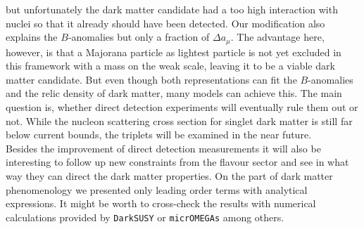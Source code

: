 but unfortunately the dark matter candidate had a too high interaction with nuclei so that it already should have been detected. Our modification 
also explains the 
$B$-anomalies but only a fraction of $\Delta a_\mu$. The advantage here, however, is that a Majorana particle as lightest particle is not yet
excluded in this framework with a mass on the weak scale, leaving it to be a viable dark matter candidate. But even though both representations 
can fit the $B$-anomalies and the relic density of dark matter, many models can achieve this. The main question is, whether direct detection 
experiments will eventually rule them out or not. While the nucleon scattering cross section for singlet dark matter is still far below current bounds,
the triplets will be examined in the near future.\\
\noindent Besides the improvement of direct detection measurements it will also be interesting to follow up new constraints from the flavour 
sector and see in what way they can direct the dark matter properties. On the part of dark matter phenomenology we presented only leading order
terms with analytical expressions. It might be worth to cross-check the results with numerical calculations provided by \texttt{DarkSUSY} 
\cite{0406204} or \texttt{micrOMEGAs} \cite{1005.4133} among others. 